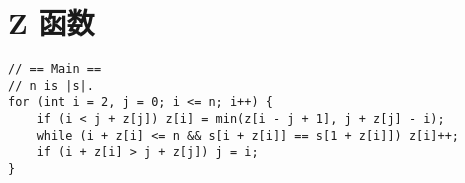\section{Z 函数}

\begin{verbatim}
// == Main ==
// n is |s|.
for (int i = 2, j = 0; i <= n; i++) {
    if (i < j + z[j]) z[i] = min(z[i - j + 1], j + z[j] - i);
    while (i + z[i] <= n && s[i + z[i]] == s[1 + z[i]]) z[i]++;
    if (i + z[i] > j + z[j]) j = i;
}
\end{verbatim}